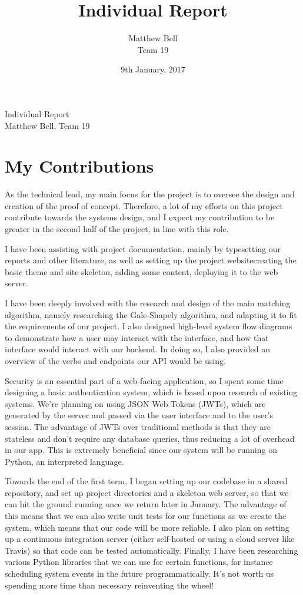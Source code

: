 \documentclass[14pt]{report}
\title{Individual Report}
\date{9th January, 2017}
\author{Matthew Bell\\ Team 19}
\begin{document}
    \begin{center}
        \Huge{Individual Report}\\
        \LARGE{Matthew Bell, Team 19}
    \end{center}

    \section*{My Contributions}
    As the technical lead, my main focus for the project is to oversee the design and creation of the proof of concept. Therefore, a lot of my efforts on this project contribute towards the systems design, and I expect my contribution to be greater in the second half of the project, in line with this role.

    I have been assisting with project documentation, mainly by typesetting our reports and other literature, as well as setting up the project website\textemdash creating the basic theme and site skeleton, adding some content, deploying it to the web server.

    I have been deeply involved with the research and design of the main matching algorithm, namely researching the Gale-Shapely algorithm, and adapting it to fit the requirements of our project. I also designed high-level system flow diagrams to demonstrate how a user may interact with the interface, and how that interface would interact with our backend. In doing so, I also provided an overview of the verbs and endpoints our API would be using.

    Security is an essential part of a web-facing application, so I spent some time designing a basic authentication system, which is based upon research of existing systems. We're planning on using JSON Web Tokens (JWTs), which are generated by the server and passed via the user interface and to the user's session. The advantage of JWTs over traditional methods is that they are stateless and don't require any database queries, thus reducing a lot of overhead in our app. This is extremely beneficial since our system will be running on Python, an interpreted language.

    Towards the end of the first term, I began setting up our codebase in a shared repository, and set up project directories and a skeleton web server, so that we can hit the ground running once we return later in January. The advantage of this means that we can also write unit tests for our functions as we create the system, which means that our code will be more reliable. I also plan on setting up a continuous integration server (either self-hosted or using a cloud server like Travis) so that code can be tested automatically. Finally, I have been researching various Python libraries that we can use for certain functions, for instance scheduling system events in the future programmatically. It's not worth us spending more time than necessary reinventing the wheel!
\end{document}
